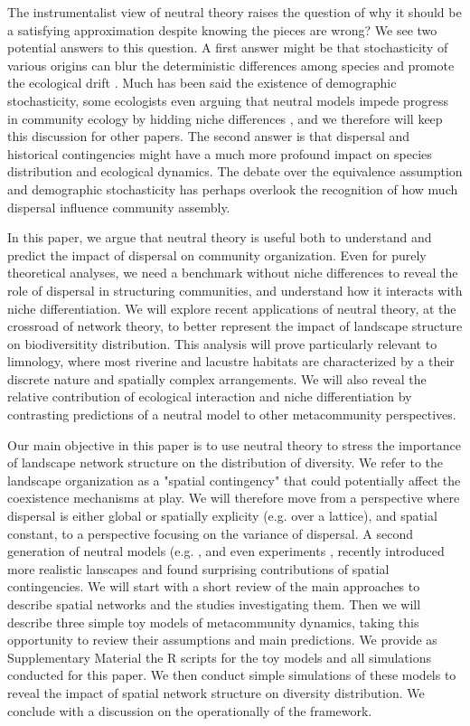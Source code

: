 \documentclass[12pt]{article}
\begin{document}
The instrumentalist view of neutral theory raises the question of why it should
be a satisfying approximation despite knowing the pieces are wrong? We see two
potential answers to this question. A first answer might be that stochasticity
of various origins can blur the deterministic differences among species and
promote the ecological drift \parencite{Gravel2011}. Much has been said the
existence of demographic stochasticity, some ecologists even arguing that
neutral models impede progress in community ecology by hidding niche differences
\parencite{Clark2012}, and we therefore will keep this discussion for other
papers. The second answer is that dispersal and historical contingencies might
have a much more profound impact on species distribution \parencite{Bahn2007}
and ecological dynamics. The debate over the equivalence assumption and
demographic stochasticity has perhaps overlook the recognition of how much
dispersal influence community assembly.

In this paper, we argue that neutral theory is useful both to understand and
predict the impact of dispersal on community organization. Even
for purely theoretical analyses, we need a benchmark without niche differences to
reveal the role of dispersal in structuring communities, and understand how it
interacts with niche differentiation. We will explore recent applications of
neutral theory, at the crossroad of network theory, to better represent the
impact of landscape structure on biodiversitity distribution. This analysis will
prove particularly relevant to limnology, where most riverine and lacustre
habitats are characterized by a their discrete nature and spatially complex
arrangements. We will also reveal the relative contribution of ecological
interaction and niche differentiation by contrasting predictions of a neutral
model to other metacommunity perspectives. 

Our main objective in this paper is to use neutral theory to stress the
importance of landscape network structure on the distribution of diversity. We
refer to the landscape organization as a "spatial contingency"
\parencite{Peres-Neto2013} that could potentially affect the coexistence
mechanisms at play. We will therefore move from a perspective where dispersal is
either global or spatially explicity (e.g. over a lattice), and spatial
constant, to a perspective focusing on the variance of dispersal. A second
generation of neutral models (e.g. \textcite{Economo2008,
Economo2011,Desjardins2012a,Desjardins2012b}, and even experiments
\parencite{Altermat2012}, recently introduced more realistic lanscapes and found
surprising contributions of spatial contingencies. We will start with a short
review of the main approaches to describe spatial networks and the studies
investigating them. Then we will describe three simple toy models of
metacommunity dynamics, taking this opportunity to review their assumptions and
main predictions. We provide as Supplementary Material the R scripts for the toy
models and all simulations conducted for this paper. We then conduct simple
simulations of these models to reveal the impact of spatial network structure on
diversity distribution. We conclude with a discussion on the operationally of
the framework.
\end{document}
